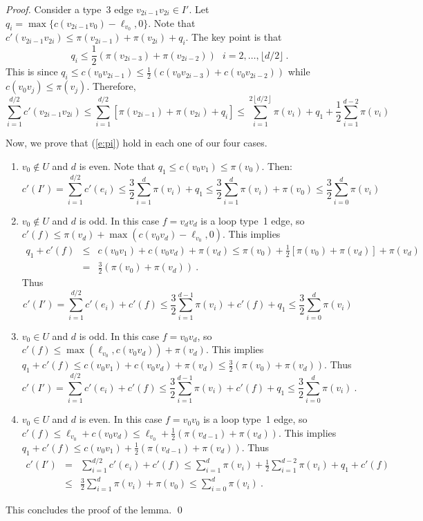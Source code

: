 \documentclass{llncs}
\begin{document}
\begin{proof}
Consider a type~3 edge $v_{2i-1}v_{2i} \in I'$. 
Let $q_i =\max\{c(v_{2i-1}v_0)-\ell_{v_0},0\}$.
Note that $c'(v_{2i-1} v_{2i})\leq \pi(v_{2i-1})+\pi(v_{2i})+q_i$. The key point is that 
$$q_i \leq \frac{1}{2} ( \pi(v_{2i-3})+\pi(v_{2i-2}) ) \ \ \  i=2, \ldots, \lfloor d/2 \rfloor \ .$$
This is since $q_i\leq c(v_0 v_{2i-1})\leq \frac{1}{2}\left(c(v_0 v_{2i-3})+c(v_0 v_{2i-2})\right)$ while $c(v_0 v_j) \leq \pi(v_j) $.
Therefore, 
$$\sum_{i=1}^{d/2} c'(v_{2i-1} v_{2i}) \leq \sum_{i=1}^{d/2}[\pi(v_{2i-1})+\pi(v_{2i})+q_i] \leq \sum_{i=1}^{2 \left\lfloor d/2 \right\rfloor}\pi(v_i)+q_1+\frac{1}{2}\sum_{i=1}^{d-2}\pi(v_i)$$

Now, we prove that (\ref{e:pi}) hold in each one of our four cases.

\begin{enumerate}
\item 
$v_0\notin U$ and $d$ is even. Note that $q_1 \leq c(v_0 v_1) \leq \pi(v_0)$.
Then: $$c'(I')=\sum_{i=1}^{d/2}c'(e_i) \leq \frac{3}{2}\sum_{i=1}^d \pi(v_i) + q_1 \leq \frac{3}{2}\sum_{i=1}^d \pi(v_i) + \pi(v_0) \leq \frac{3}{2}\sum_{i=0}^d \pi(v_i)$$
\item 
$v_0\notin U$ and $d$ is odd. In this case $f=v_d v_d$ is a loop type~1 edge, so 
$c'(f)\leq \pi(v_d)+ \max(c(v_0 v_d)-\ell_{v_0},0)$. 
This implies 
\begin{eqnarray*}
q_1+c'(f) & \leq & c(v_0 v_1) + c(v_0 v_d) + \pi(v_d) \leq \pi(v_0) + \frac{1}{2}[\pi(v_0)+\pi(v_d)]+\pi(v_d) \\
& = & \frac{3}{2}\left(\pi(v_0)+\pi(v_d)\right) \ .
\end{eqnarray*}
Thus
$$c'(I')=\sum_{i=1}^{d/2}c'(e_i) + c'(f) \leq \frac{3}{2}\sum_{i=1}^{d-1} \pi(v_i) + c'(f)+q_1 
\leq \frac{3}{2}\sum_{i=0}^d \pi(v_i)$$
\item 
$v_0\in U$ and $d$ is odd. In this case $f=v_0 v_d$, so 
$c'(f) \leq \max(\ell_{v_0},c(v_0 v_d))+\pi(v_d)$. 
This implies 
$q_1+c'(f)\leq c(v_0 v_1) + c(v_0 v_d) + \pi(v_d) \leq  \frac{3}{2}\left(\pi(v_0)+\pi(v_d)\right)$.
Thus
$$c'(I')=\sum_{i=1}^{d/2}c'(e_i) + c'(f) \leq \frac{3}{2}\sum_{i=1}^{d-1} \pi(v_i) + c'(f)+q_1 
\leq \frac{3}{2}\sum_{i=0}^d \pi(v_i) \ .$$
\item 
$v_0\in U$ and $d$ is even. In this case $f= v_0 v_0$ is a loop type~1 edge, 
so $c'(f)\leq \ell_{v_0}+c(v_0 v_d)\leq \ell_{v_0}+\frac{1}{2}\left(\pi(v_{d-1})+\pi(v_d)\right)$. This implies $q_1+c'(f)\leq c(v_0 v_1)+\frac{1}{2}\left(\pi(v_{d-1})+\pi(v_d)\right)$.
Thus
\begin{eqnarray*}
c'(I') & = & \sum_{i=1}^{d/2}c'(e_i) +c'(f) \leq \sum_{i=1}^d \pi(v_i) +  \frac{1}{2}\sum_{i=1}^{d-2}\pi(v_i) +q_1+c'(f) \\
& \leq & \frac{3}{2}\sum_{i=1}^{d}\pi(v_i) + \pi(v_0) \leq \sum_{i=0}^d \pi(v_i) \ .
\end{eqnarray*}
\end{enumerate}
This concludes the proof of the lemma.
\qed
\end{proof}
\end{document}
